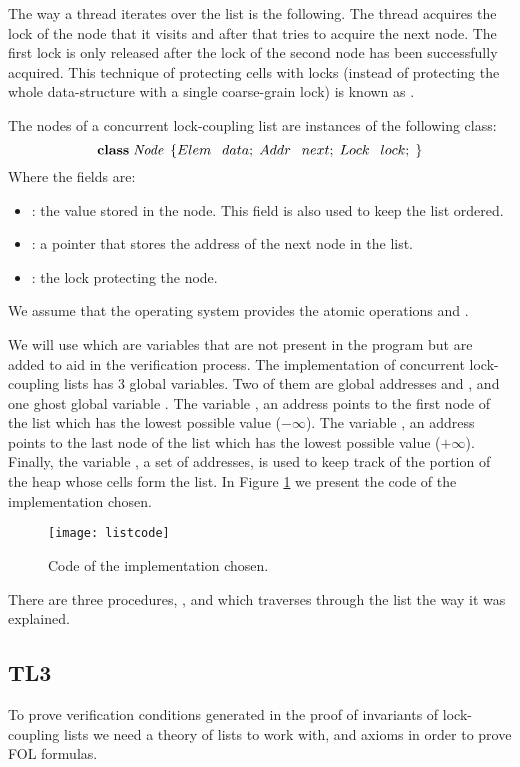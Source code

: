 The way a thread iterates over the list is the following.
%
The thread acquires the lock of the node
that it visits and after that tries to acquire the next node.
The first lock is only released after the lock of the
second node has been successfully acquired.
%
This technique of protecting cells with locks (instead of protecting
the whole data-structure with a single coarse-grain lock) is known as
.


The nodes of a concurrent lock-coupling list are instances of the following 
\ListNode class:
%
\[
	  \textbf{class} \;\mathit{Node}  \;\left\{
				Elem \:\;\; data; \;
				Addr \:\;\; next; \;
				Lock \:\;\; lock; \;
		\right\}
\]
%
Where the fields are:
\begin{itemize}
		\item \fData: the value stored in the node. This field is also used to keep 
			the list ordered.
		\item \fNext: a pointer that stores the address of the next node in 
			the list.
		\item \fLock: the lock protecting the node.
\end{itemize}

We assume that the operating system provides the atomic operations \fLock 
and \fUnlock. 

We will use  which are variables that are not present in the program but are added to aid in the verification process.
%
The implementation of concurrent lock-coupling lists has 3 global variables.
%
Two of them are global addresses \head and \tail, and one ghost global variable \region.
The variable \head, an address points to the first node of the list which has the lowest possible value ($-\infty$).
%
The variable \tail, an address points to the last node of the list  which has the lowest possible value ($+\infty$).
%
Finally, the variable \region, a set of addresses, is used to keep track of the portion of the heap whose cells form the list.
%
In Figure \ref{fig:listcode} we present the code of the implementation chosen.

\begin{figure}
	\centering	
	\label{fig:listcode}
	\texttt{[image: listcode]}
	\caption{Code of the implementation chosen.}
\end{figure}
%
There are three procedures, \Search, \Insert and \Remove which traverses through the list the way it was explained.



\subsection{TL3}
To prove verification conditions generated in the proof of invariants of lock-coupling lists we need a theory of lists to work with, and axioms in order to prove \gls{FOL} formulas.

